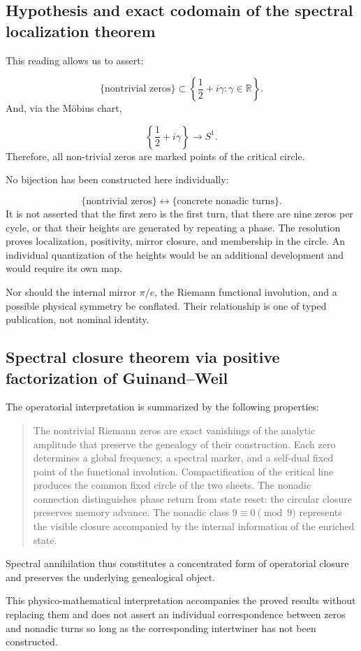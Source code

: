 \subsection{Hypothesis and exact codomain of the spectral localization theorem}
This reading allows us to assert:\par
\[
\{\text{nontrivial zeros}\}
\subset
\left\{
\frac12+i\gamma:\gamma\in\mathbb R
\right\}.
\]
And, via the Möbius chart,\par
\[
\left\{
\frac12+i\gamma
\right\}
\longrightarrow
S^1.
\]
Therefore, all non-trivial zeros are marked points of the critical circle.\par
No bijection has been constructed here individually:\par
\[
\{
\text{nontrivial zeros}
\}
\longleftrightarrow
\{
\text{concrete nonadic turns}
\}.
\]
It is not asserted that the first zero is the first turn, that there are nine zeros per cycle, or that their heights are generated by repeating a phase. The resolution proves localization, positivity, mirror closure, and membership in the circle. An individual quantization of the heights would be an additional development and would require its own map.\par
Nor should the internal mirror \(\pi/e\), the Riemann functional involution, and a possible physical symmetry be conflated. Their relationship is one of typed publication, not nominal identity.\par
{}
\subsection{Spectral closure theorem via positive factorization of Guinand–Weil}
The operatorial interpretation is summarized by the following properties:\par
\begin{quote}
The nontrivial Riemann zeros are exact vanishings of the analytic amplitude that preserve the genealogy of their construction. Each zero determines a global frequency, a spectral marker, and a self-dual fixed point of the functional involution. Compactification of the critical line produces the common fixed circle of the two sheets. The nonadic connection distinguishes phase return from state reset: the circular closure preserves memory advance. The nonadic class \(9\equiv0\pmod 9\) represents the visible closure accompanied by the internal information of the enriched state.\par
\end{quote}
Spectral annihilation thus constitutes a concentrated form of operatorial closure and preserves the underlying genealogical object.\par
This physico-mathematical interpretation accompanies the proved results without replacing them and does not assert an individual correspondence between zeros and nonadic turns so long as the corresponding intertwiner has not been constructed.\par

